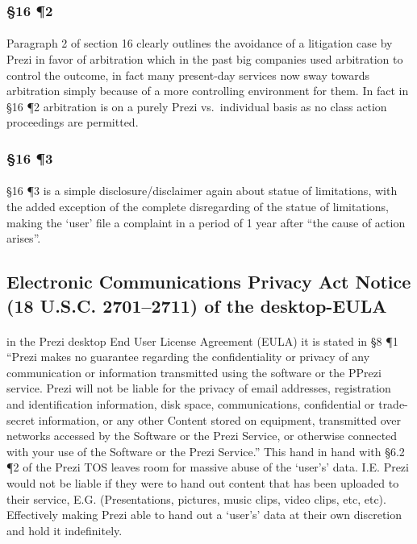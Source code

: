 \subsubsection{\S16 \P2}
\paragraph{}
Paragraph 2 of section 16 clearly outlines the avoidance of a
litigation case by Prezi\texttrademark{} in favor of arbitration which in the past
big companies used arbitration to control the outcome, in fact many present-day
services now sway towards arbitration simply because of a more controlling
environment for them. In fact in \S 16 \P 2 arbitration is on a purely
Prezi\texttrademark{} vs.\ individual basis as no class action proceedings are
permitted.
\par

\subsubsection{\S16 \P3}
\paragraph{} \S16 \P3 is a simple disclosure/disclaimer again about statue of
limitations, with the added exception of the complete disregarding of the statue
of limitations, making the `user' file a complaint in a period of 1 year after
``the cause of action arises''.
\par

\subsection{Electronic Communications Privacy Act Notice (18 U.S.C. 2701--2711)
of the desktop-EULA}
\paragraph{}
in the Prezi\texttrademark{} desktop End User License Agreement (EULA) it is
stated in \S8 \P1 ``Prezi makes no guarantee regarding the confidentiality or
privacy of any communication or information transmitted using the software or
the PPrezi service. Prezi will not be liable for the privacy of email addresses,
registration and identification information, disk space, communications,
confidential or trade-secret information, or any other Content stored on
equipment, transmitted over networks accessed by the Software or the Prezi
Service, or otherwise connected with your use of the Software or the Prezi
Service.'' This hand in hand with \S6.2 \P2 of the Prezi\texttrademark{} TOS
leaves room for massive abuse of the `user's' data. I.E. Prezi\texttrademark{}
would not be liable if they were to hand out content that has been uploaded to
their service, E.G. (Presentations, pictures, music clips, video clips, etc,
etc). Effectively making Prezi\texttrademark{} able to hand out a `user's' data at
their own discretion and hold it indefinitely.
\par

